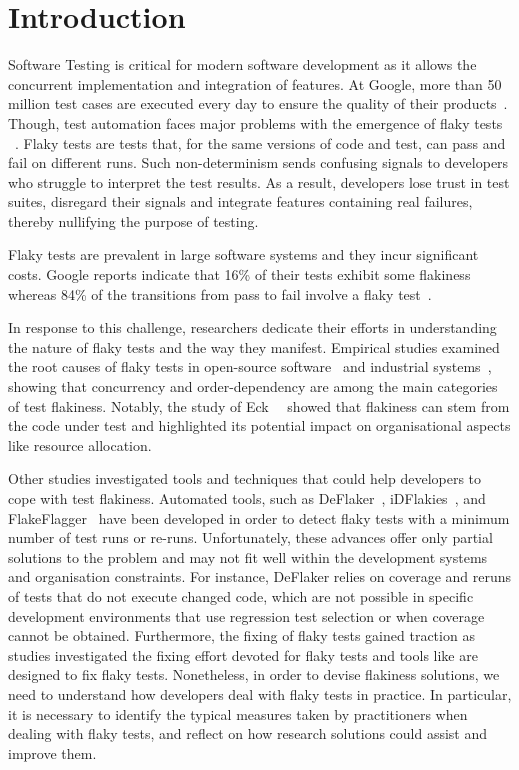 \section{Introduction}
\label{sec:survey-introduction}

Software Testing is critical for modern software development as it allows the concurrent implementation and integration of features.
At Google, more than 50 million test cases are executed every day to ensure the quality of their products~\cite{Welcomet41:online}.
Though, test automation faces major problems with the emergence of  flaky tests
~\cite{FlakinessGoogle,Mozilla,FlakinessSpotify}. Flaky tests are tests that, for the same versions of code and test, can pass and fail on different runs.
Such non-determinism sends confusing signals to developers who struggle to interpret the test results.
As a result, developers lose trust in test suites, disregard their signals and integrate features containing real failures, thereby nullifying the purpose of testing.

Flaky tests are prevalent in large software systems and they incur significant costs.
Google reports indicate that 16\% of their tests exhibit some flakiness whereas 84\% of the transitions from pass to fail involve a flaky test~\cite{FlakinessGoogle}.

In response to this challenge, researchers dedicate their efforts in understanding the nature of flaky tests and the way they manifest.
Empirical studies examined the root causes of flaky tests in open-source software~\cite{Luo2014,Eck2019,Thorve2018,Dutta2020} and industrial systems~\cite{Lam2019RootCausing}, showing that concurrency and order-dependency are among the main categories of test flakiness. 
Notably, the study of Eck~\etal~\cite{Eck2019} showed that flakiness can stem from the code under test and highlighted its potential impact on organisational aspects like resource allocation.

Other studies investigated tools and techniques that could help developers to cope with test flakiness.
Automated tools, such as DeFlaker~\cite{Bell2018}, iDFlakies~\cite{Lam2019iDFlakies}, and FlakeFlagger~\cite{FlakeFlagger} have been developed in order to detect flaky tests with a minimum number of test runs or re-runs. Unfortunately, these advances offer only partial solutions to the problem and may not fit well within the development systems and organisation constraints. For instance, DeFlaker relies on coverage and reruns of tests that do not execute changed code, which are not possible in specific development environments that use regression test selection or when coverage cannot be obtained.     
Furthermore, the fixing of flaky tests gained traction as studies investigated the fixing effort devoted for flaky tests and tools like \cite{Shi2019iFix} are designed to fix flaky tests.
Nonetheless, in order to devise flakiness solutions, we need to understand how developers deal with flaky tests in practice.
In particular, it is necessary to identify the typical measures taken by practitioners when dealing with flaky tests, and reflect on how research solutions could assist and improve them.

